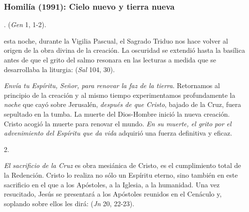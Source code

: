 \newpage 

\subsubsection{Homilía (1991): Cielo nuevo y tierra nueva}


\begin{body}
.  (\textit{Gen} 1, 1-2). 

 esta noche, durante la Vigilia Pascual, el Sagrado Triduo nos hace volver al origen de la obra divina de la creación. La oscuridad se extendió hasta la basílica antes de que el grito del salmo resonara en las lecturas a medida que se desarrollaba la liturgia:  (\textit{Sal} 104, 30). 

\textit{Envía tu Espíritu, Señor, para renovar la faz de la tierra}. Retornamos al principio de la creación y al mismo tiempo experimentamos profundamente la \textit{noche} que cayó sobre Jerusalén, \textit{después de que Cristo}, bajado de la Cruz, fuera sepultado en la tumba. La muerte del Dios-Hombre inició la nueva creación. Cristo acogió la muerte para renovar el mundo. \textit{En su muerte, el grito por el advenimiento del Espíritu que da vida} adquirió una fuerza definitiva y eficaz. 

2.  

\textit{El sacrificio de la Cruz} es obra mesiánica de Cristo, es el cumplimiento total de la Redención. Cristo lo realiza no sólo  un Espíritu eterno, sino también en este sacrificio en el que  a los Apóstoles, a la Iglesia, a la humanidad. Una vez resucitado, Jesús se presentará a los Apóstoles reunidos en el Cenáculo y, soplando sobre ellos les dirá:  (\textit{Jn} 20, 22-23). 


\end{body}
